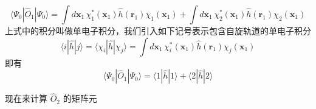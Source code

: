 \documentclass[fontset=none,12pt,a4paper]{ctexart}
\numberwithin{equation}{section}
\begin{document}
\begin{equation}
  \langle\Psi_0|\hat{O}_1|\Psi_0\rangle
  = \int d\mathbf{x}_1\, \chi_1^*(\mathbf{x}_1)\hat{h}(\mathbf{r}_1)\chi_1(\mathbf{x}_1)
  + \int d\mathbf{x}_1\, \chi_2^*(\mathbf{x}_1)\hat{h}(\mathbf{r}_1)\chi_2(\mathbf{x}_1)
\end{equation}
上式中的积分叫做单电子积分，我们引入如下记号表示包含自旋轨道的单电子积分
\begin{equation}
  \langle i|\hat{h}|j\rangle = \langle\chi_i|\hat{h}|\chi_j\rangle
  = \int d\mathbf{x}_1\, \chi_i^*(\mathbf{x}_1)\hat{h}(\mathbf{r}_1)\chi_j(\mathbf{x}_1)
\end{equation}
即有
\begin{equation}
  \langle\Psi_0|\hat{O}_1|\Psi_0\rangle
  = \langle 1|\hat{h}|1\rangle + \langle 2|\hat{h}|2\rangle
\end{equation}

 现在来计算 $\hat{O}_2$ 的矩阵元
\end{document}
